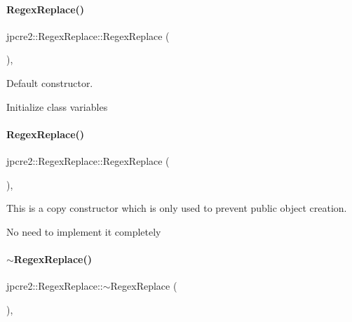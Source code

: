 \paragraph{\texorpdfstring{Regex\+Replace()}{RegexReplace()}\hspace{0.1cm}{\footnotesize\ttfamily [1/2]}}
{\footnotesize\ttfamily jpcre2\+::\+Regex\+Replace\+::\+Regex\+Replace (\begin{DoxyParamCaption}{ }\end{DoxyParamCaption})\hspace{0.3cm}{\ttfamily [inline]}, {\ttfamily [private]}}



Default constructor. 

Initialize class variables \hypertarget{classjpcre2_1_1RegexReplace_a257d326d57af9ccbc7a45b002c34ed0a_a257d326d57af9ccbc7a45b002c34ed0a}{}\label{classjpcre2_1_1RegexReplace_a257d326d57af9ccbc7a45b002c34ed0a_a257d326d57af9ccbc7a45b002c34ed0a} 
\paragraph{\texorpdfstring{Regex\+Replace()}{RegexReplace()}\hspace{0.1cm}{\footnotesize\ttfamily [2/2]}}
{\footnotesize\ttfamily jpcre2\+::\+Regex\+Replace\+::\+Regex\+Replace (\begin{DoxyParamCaption}\item[{const \hyperlink{classjpcre2_1_1RegexReplace}{Regex\+Replace} \&}]{ }\end{DoxyParamCaption})\hspace{0.3cm}{\ttfamily [inline]}, {\ttfamily [private]}}



This is a copy constructor which is only used to prevent public object creation. 

No need to implement it completely \hypertarget{classjpcre2_1_1RegexReplace_ab27102839e7ff0914bcd204d750097ac_ab27102839e7ff0914bcd204d750097ac}{}\label{classjpcre2_1_1RegexReplace_ab27102839e7ff0914bcd204d750097ac_ab27102839e7ff0914bcd204d750097ac} 
\paragraph{\texorpdfstring{$\sim$\+Regex\+Replace()}{~RegexReplace()}}
{\footnotesize\ttfamily jpcre2\+::\+Regex\+Replace\+::$\sim$\+Regex\+Replace (\begin{DoxyParamCaption}{ }\end{DoxyParamCaption})\hspace{0.3cm}{\ttfamily [inline]}, {\ttfamily [private]}}



